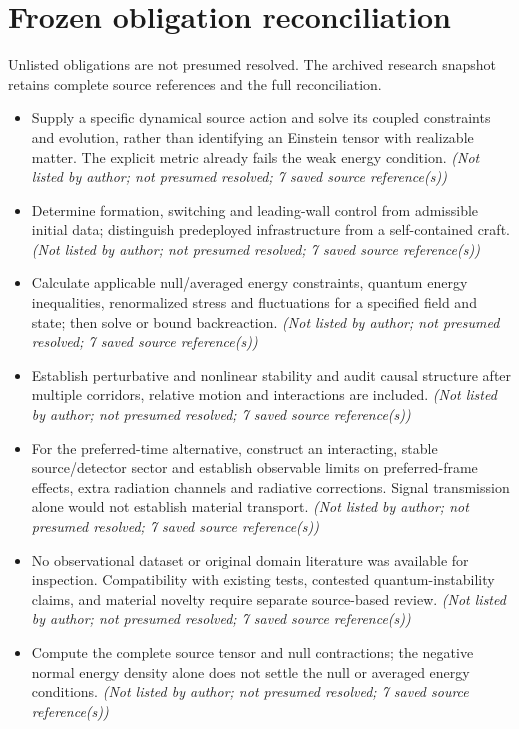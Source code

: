 \documentclass[11pt]{article}
\begin{document}
\section{Frozen obligation reconciliation}
Unlisted obligations are not presumed resolved. The archived research snapshot retains complete source references and the full reconciliation.
\begin{itemize}
\item Supply a specific dynamical source action and solve its coupled constraints and evolution, rather than identifying an Einstein tensor with realizable matter. The explicit metric already fails the weak energy condition. \textit{ (Not listed by author; not presumed resolved; 7 saved source reference(s))}
\item Determine formation, switching and leading-wall control from admissible initial data; distinguish predeployed infrastructure from a self-contained craft. \textit{ (Not listed by author; not presumed resolved; 7 saved source reference(s))}
\item Calculate applicable null/averaged energy constraints, quantum energy inequalities, renormalized stress and fluctuations for a specified field and state; then solve or bound backreaction. \textit{ (Not listed by author; not presumed resolved; 7 saved source reference(s))}
\item Establish perturbative and nonlinear stability and audit causal structure after multiple corridors, relative motion and interactions are included. \textit{ (Not listed by author; not presumed resolved; 7 saved source reference(s))}
\item For the preferred-time alternative, construct an interacting, stable source/detector sector and establish observable limits on preferred-frame effects, extra radiation channels and radiative corrections. Signal transmission alone would not establish material transport. \textit{ (Not listed by author; not presumed resolved; 7 saved source reference(s))}
\item No observational dataset or original domain literature was available for inspection. Compatibility with existing tests, contested quantum-instability claims, and material novelty require separate source-based review. \textit{ (Not listed by author; not presumed resolved; 7 saved source reference(s))}
\item Compute the complete source tensor and null contractions; the negative normal energy density alone does not settle the null or averaged energy conditions. \textit{ (Not listed by author; not presumed resolved; 7 saved source reference(s))}

\end{itemize}
\end{document}
